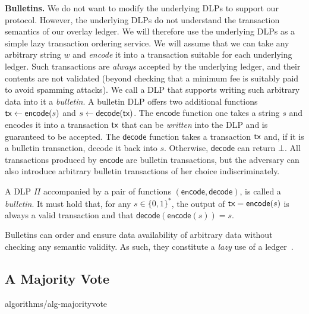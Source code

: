 \textbf{Bulletins.}
We do not want to modify the underlying DLPs to support our protocol. However, the underlying DLPs
do not understand the transaction semantics of our overlay ledger. We will therefore use the underlying
DLPs as a simple lazy transaction ordering service. We will assume that we can take any
arbitrary string $w$ and \emph{encode} it into a transaction suitable for each underlying ledger.
Such transactions are \emph{always} accepted by the underlying ledger, and their contents
are not validated (beyond checking that a minimum fee is suitably paid to avoid spamming attacks).
We call a DLP that supports writing such arbitrary data into it a \emph{bulletin}. A bulletin
DLP offers two additional functions $\textsf{tx} \gets \textsf{encode}(s)$ and $s \gets \textsf{decode}(\textsf{tx})$.
The $\textsf{encode}$ function one takes a string $s$ and encodes it into a transaction $\textsf{tx}$ that can be \emph{written}
into the DLP and is guaranteed to be accepted. The $\textsf{decode}$ function takes a transaction $\textsf{tx}$
and, if it is a bulletin transaction, decode it back into $s$. Otherwise, $\textsf{decode}$ can return $\bot$.
All transactions produced by $\textsf{encode}$
are bulletin transactions, but the adversary can also introduce arbitrary bulletin transactions of her choice
indiscriminately.

\begin{definition}[Bulletin]
  A DLP $\Pi$ accompanied by a pair of functions $(\textsf{encode}, \textsf{decode})$,
  is called a \emph{bulletin}. It must hold that, for any $s \in \{0, 1\}^*$,
  the output of $\textsf{tx} = \textsf{encode}(s)$ is always a valid
  transaction and that $\textsf{decode}(\textsf{encode}(s)) = s$.
\end{definition}

Bulletins can order and ensure data availability of arbitrary data without checking
any semantic validity. As such, they constitute a \emph{lazy} use of a ledger~\cite{lazyledger,lazylight}.

\subsection{A Majority Vote}\label{sec:construction-naive}

{algorithms/alg-majorityvote}

